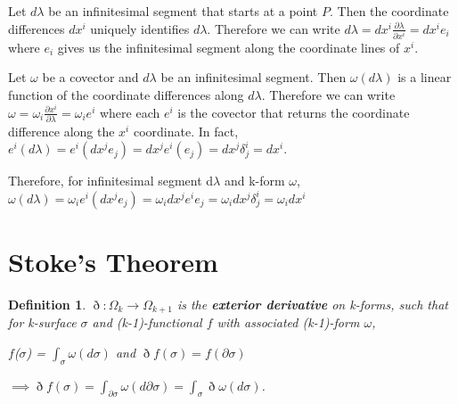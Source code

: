 \documentclass{book}
\newtheorem{defn}[equation]{Definition}
\begin{document}
Let $d\lambda$ be an infinitesimal segment that starts at a point $P$. Then the coordinate differences $dx^i$ uniquely identifies $d\lambda$. Therefore we can write $d\lambda = dx^i \frac{\partial \lambda}{\partial x^i} = dx^i e_i$ where $e_i$ gives us the infinitesimal segment along the coordinate lines of $x^i$.

Let $\omega$ be a covector and $d\lambda$ be an infinitesimal segment. Then $\omega(d\lambda)$ is a linear function of the coordinate differences along $d\lambda$. Therefore we can write $\omega = \omega_i \frac{\partial x^i}{\partial \lambda} = \omega_i e^i$ where each $e^i$ is the covector that returns the coordinate difference along the $x^i$ coordinate. In fact, $e^i(d\lambda) = e^i(dx^j e_j) = dx^j e^i(e_j) = dx^j \delta^i_j = dx^i$.


Therefore, for infinitesimal segment d$\lambda$ and k-form $\omega$, $\omega(d\lambda) = \omega_ie^i(dx^je_j) = \omega_idx^je^ie_j = \omega_idx^j\delta^i_j = \omega_i dx^i$ 

\section{Stoke's Theorem}



\begin{defn}
	$\eth : \Omega_k \to \Omega_{k+1}$ is the \textbf{exterior derivative} on k-forms, such that for k-surface $\sigma$ and (k-1)-functional $f$ with associated (k-1)-form $\omega$, 
	
	$f$($\sigma$) = $\int_{\sigma}\omega(d\sigma)$ and $\eth f(\sigma) = f(\partial\sigma)$
	
	$\implies \eth f(\sigma) = \int_{\partial\sigma} \omega(d\partial\sigma) = \int_{\sigma} \eth\omega(d\sigma)$. 
\end{defn}




 

\end{document}
